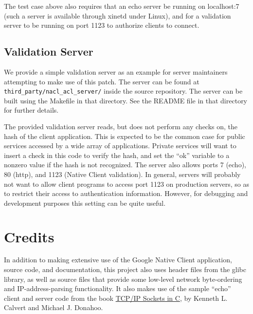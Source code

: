 \documentclass[a4paper,10pt]{article}
\begin{document}
The test case above also requires that an echo server be running on
localhost:7 (such a server is available through xinetd under Linux), and for a
validation server to be running on port 1123 to authorize clients to connect.

\subsection{Validation Server}

We provide a simple validation server as an example for server maintainers
attempting to make use of this patch.  The server can be found at
\texttt{third\_party/nacl\_acl\_server/} inside the source repository.  The
server can be built using the Makefile in that directory.  See the README file
in that directory for further details.

The provided validation server reads, but does not perform any checks on, the
hash of the client application.  This is expected to be the common case for
public services accessed by a wide array of applications.  Private services
will want to insert a check in this code to verify the hash, and set the ``ok''
variable to a nonzero value if the hash is not recognized.  The server also
allows ports 7 (echo), 80 (http), and 1123 (Native Client validation).  In
general, servers will probably not want to allow client programs to access port
1123 on production servers, so as to restrict their access to authentication
information. However, for debugging and development purposes this setting can be
quite useful.

\section{Credits}

In addition to making extensive use of the Google Native Client application,
source code, and documentation, this project also uses header files from
the glibc library,  as well as source files that provide some low-level network
byte-ordering and IP-address-parsing functionality.  It also makes use of the
sample ``echo'' client and server code from the book \underline{TCP/IP Sockets
in C}, by Kenneth L. Calvert and Michael J. Donahoo.
\end{document}
